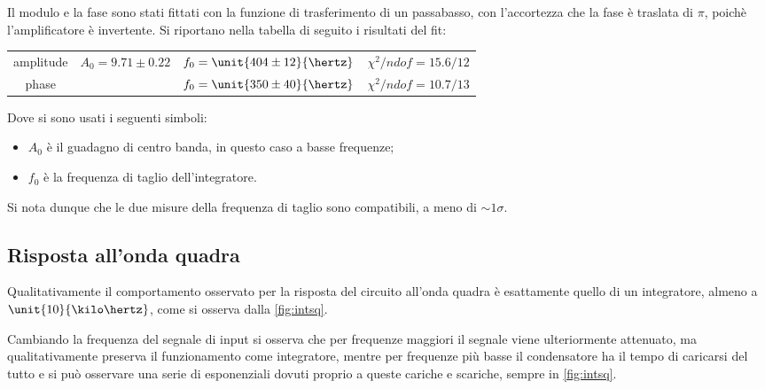 \documentclass[10pt,a4paper]{article}
\begin{document}
Il modulo e la fase sono stati fittati con la funzione di trasferimento di un passabasso, con l'accortezza che la fase è traslata di $\pi$, poichè l'amplificatore è invertente. Si riportano nella tabella di seguito i risultati del fit:

\begin{table}[H]
\centering
\begin{tabular}{c|ccc}
amplitude	&	$A_0 = 9.71 \pm 0.22$	&	$f_0 = \unit{404 \pm 12}{\hertz}$	&	$\chi^2/ndof = 15.6 / 12$\\
phase		& &	$f_0 = \unit{350 \pm 40}{\hertz}$	&	$\chi^2/ndof = 10.7 / 13$
\end{tabular}
\end{table}

\noindent Dove si sono usati i seguenti simboli:
\begin{itemize}
\item $A_0$ è il guadagno di centro banda, in questo caso a basse frequenze;

\item $f_0$ è la frequenza di taglio dell'integratore.
\end{itemize}

Si nota dunque che le due misure della frequenza di taglio sono compatibili, a meno di $\sim 1\sigma$.

\subsection{Risposta all'onda quadra}

Qualitativamente il comportamento osservato per la risposta del circuito all'onda quadra è esattamente quello di un integratore, almeno a $\unit{10}{\kilo\hertz}$, come si osserva dalla \figurename{\ref{fig:intsq}}.

Cambiando la frequenza del segnale di input si osserva che per frequenze maggiori il segnale viene ulteriormente attenuato, ma qualitativamente preserva il funzionamento come integratore, mentre per frequenze più basse il condensatore ha il tempo di caricarsi del tutto e si può osservare una serie di esponenziali dovuti proprio a queste cariche e scariche, sempre in \figurename{\ref{fig:intsq}}.
\end{document}
